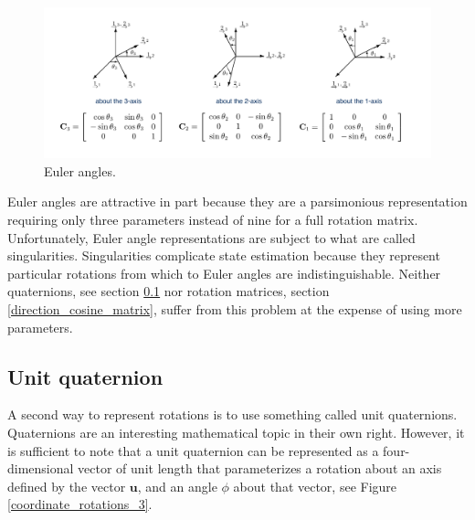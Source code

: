 \begin{figure}[!htb]
\begin{center}
\includegraphics[scale=0.310]{img/coordinate_transforms/coordinate_rotations_4.jpeg}
\end{center}
\caption{Euler angles.}
\label{coordinate_rotations_4}
\end{figure}

Euler angles are attractive in part because they are
a parsimonious representation requiring only three parameters instead
of nine for a full rotation matrix. Unfortunately,
Euler angle representations are subject to what are
called singularities. Singularities complicate
state estimation because they represent particular rotations from which to
Euler angles are indistinguishable. Neither quaternions, see section \ref{unit_quaternion} nor
rotation matrices, section \ref{direction_cosine_matrix}, suffer from this problem at the expense
of using more parameters.

\subsection{Unit quaternion}
\label{unit_quaternion}

A second way to represent rotations is to use something called unit quaternions. Quaternions are an interesting
mathematical topic in their own right. However, it is sufficient to note that a unit quaternion can be represented as
a four-dimensional vector of unit length that parameterizes a rotation about an axis
defined by the vector $\mathbf{u}$, and an angle $\phi$ about that vector, see Figure \ref{coordinate_rotations_3}. 

